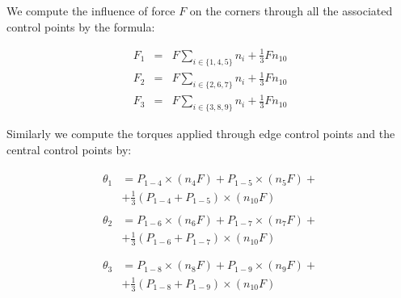 \documentclass{egpubl}
\begin{document}
We compute the influence of force $F$ on the corners through all the
associated control points by the formula:

\begin{eqnarray}
    F_1 & = & F \sum_{i \in \{1,4,5\}} n_i + \frac{1}{3} F n_{10} \\
    F_2 & = & F \sum_{i \in \{2,6,7\}} n_i + \frac{1}{3} F n_{10} \\
    F_3 & = & F \sum_{i \in \{3,8,9\}} n_i + \frac{1}{3} F n_{10}
\end{eqnarray}


Similarly we compute the torques applied through edge control points and
the central control points by:

\begin{gather}
    \begin{split}
        \theta_1 & = P_{1-4} \times (n_4 F) + P_{1-5} \times (n_5 F) + \\
        & + \frac{1}{3} (P_{1-4} + P_{1-5}) \times (n_{10} F)
    \end{split}
    \\
    \begin{split}
        \theta_2 & = P_{1-6} \times (n_6 F) + P_{1-7} \times (n_7 F) + \\
        & + \frac{1}{3} (P_{1-6} + P_{1-7}) \times (n_{10} F) \\
    \end{split}
    \\
    \begin{split}
        \theta_3 & = P_{1-8} \times (n_8 F) + P_{1-9} \times (n_9 F) + \\
        & + \frac{1}{3} (P_{1-8} + P_{1-9}) \times (n_{10} F) \\
    \end{split}
\end{gather}
\end{document}
